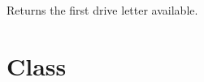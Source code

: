 \documentclass[letterpaper,10pt,english]{sphinxmanual}
\begin{document}
\begin{fulllineitems}
\label{\detokenize{index:fsbackup.diskTools.getAvailableLetter}}
Returns the first drive letter available.

\end{fulllineitems}



\section{Class }
\label{\detokenize{index:module-fsbackup.hashVolume}}\label{\detokenize{index:class-hashvolume}}\label{\detokenize{index:module-hashVolume}}
\end{document}
